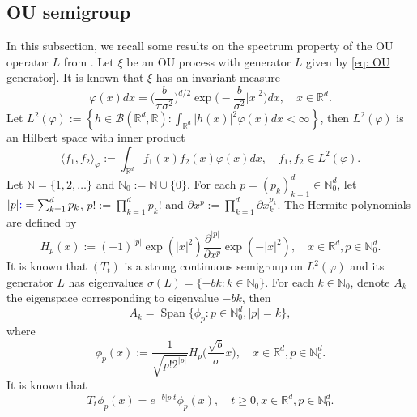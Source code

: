 \documentclass[12pt,oneside,english]{amsart}
\theoremstyle{plain}
\theoremstyle{definition}
\numberwithin{equation}{section}
\newcommand{\added}[1]{{\color{blue}#1}}\newcommand{\deleted}[1]{{\color{red}#1}}
\begin{document}
\subsection{OU semigroup}
    In this subsection, we recall some results on the spectrum property of the OU operator $L$ from \cite{GD}.
    Let $\xi$ be an OU process with generator $L$ given by \eqref{eq: OU generator}.
    It is known that $\xi$ has an invariant measure
\begin{equation}
\label{invariantdensity}
    \varphi(x)dx
    =\Big (\frac{b}{\pi \sigma^2}\Big )^{d/2}\exp \Big(-\frac{b}{\sigma^2}|x|^2 \Big)dx,
    \quad x\in \mathbb{R}^d.
\end{equation}
    Let $L^2(\varphi):= \left\{ h  \in \mathcal B(\mathbb R^d, \mathbb R): \int_{\mathbb{R}^d} |h(x)|^2 \varphi(x) dx < \infty \right\}$, then $L^2(\varphi)$ is an Hilbert space with inner product
\begin{equation}
    \langle f_1, f_2 \rangle_{\varphi}
    := \int_{\mathbb{R}^d}f_1(x)f_2(x)\varphi(x) dx, \quad f_1,f_2 \in L^2(\varphi).
\end{equation}
     Let $\mathbb N = \{1,2,\dots\}$ and $\mathbb N_0 := \mathbb N\cup\{0\}$.
    For each $p = (p_k)_{k = 1}^d \in \mathbb{N}_0^{d}$, let $|p| \added{ :}=\sum_{k=1}^d p_k$, $p!:= \prod_{k= 1}^d p_k !$ and $\partial x^p:= \prod_{k = 1}^d\partial x_k^{p_k}$.
    The Hermite polynomials are defined by
\begin{equation}
    H_p(x)
    :=(-1)^{|p|}\exp(|x|^2) \frac{\partial ^{|p|}}{\partial x^p} \exp(-|x|^2) ,
    \quad x\in \mathbb R^d, p \in \mathbb{N}_0^{d}.
\end{equation}
    It is known that $(T_t)$ is a strong continuous semigroup on $L^2(\varphi)$ and its generator $L$ has eigenvalues $\sigma(L)= \{-bk: k \in \mathbb N_0\}$.
    For each $k \in \mathbb N_0$, denote $A_k$ the eigenspace corresponding to eigenvalue $-bk$, then
\begin{equation}
    A_k
    = \operatorname{Span} \{\phi_p : p\in \mathbb N_0^d, |p|=k\},
\end{equation}
where
\begin{equation}\label{eigenfunction}
    \phi_p(x)
    := \frac{1}{\sqrt{ p! 2^{|p|} }} H_p \Big(\frac{ \sqrt{b} }{\sigma}x \Big),
    \quad x\in \mathbb{R}^d, p\in \mathbb N_0^d.
\end{equation}
    It is known that
\begin{equation}\label{semigroupformula}
    T_t\phi_p(x)
    =e^{-b|p|t}\phi_p(x),
    \quad t\geq 0, x\in \mathbb{R}^d, p\in \mathbb N_0^d.
\end{equation}
\end{document}
